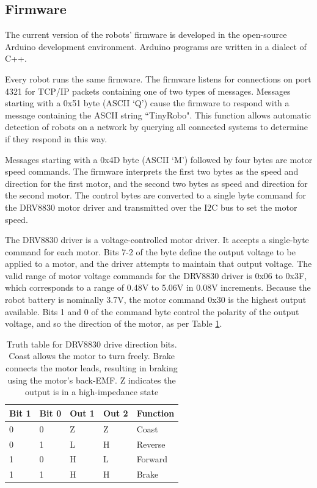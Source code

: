 \subsection {Firmware}

The current version of the robots' firmware is developed in the open-source Arduino development environment.
Arduino programs are written in a dialect of C++. 

Every robot runs the same firmware. 
The firmware listens for connections on port 4321 for TCP/IP packets containing one of two types of messages. 
Messages starting with a 0x51 byte (ASCII `Q') cause the firmware to respond with a message containing the ASCII string ``TinyRobo". 
This function allows automatic detection of robots on a network by querying all connected systems to determine if they respond in this way. 

Messages starting with a 0x4D byte (ASCII `M') followed by four bytes are motor speed commands.
The firmware interprets the first two bytes as the speed and direction for the first motor, and the second two bytes as speed and direction for the second motor.
The control bytes are converted to a single byte command for the DRV8830 motor driver and transmitted over the I2C bus to set the motor speed.

The DRV8830 driver is a voltage-controlled motor driver. 
It accepts a single-byte command for each motor. 
Bits 7-2 of the byte define the output voltage to be applied to a motor, and the driver attempts to maintain that output voltage.
The valid range of motor voltage commands for the DRV8830 driver is 0x06 to 0x3F, which corresponds to a range of 0.48V to 5.06V in 0.08V increments. 
Because the robot battery is nominally 3.7V, the motor command 0x30 is the highest output available. 
Bits 1 and 0 of the command byte control the polarity of the output voltage, and so the direction of the motor, as per Table \ref{tab:DRV8830_truth}.

\begin{table}
	\centering
	\begin{tabular}{l l l l l}
		Bit 1 & Bit 0 & Out 1 & Out 2 & Function\\
		\hline
		0 & 0 & Z & Z & Coast\\
		0 & 1 & L & H & Reverse\\
		1 & 0 & H & L & Forward\\
		1 & 1 & H & H & Brake\\				
	\end{tabular}
	
	\caption{Truth table for DRV8830 drive direction bits. Coast allows the motor to turn freely. Brake connects the motor leads, resulting in braking using the motor's back-EMF. Z indicates the output is in a high-impedance state}
	\label{tab:DRV8830_truth}
\end{table}

